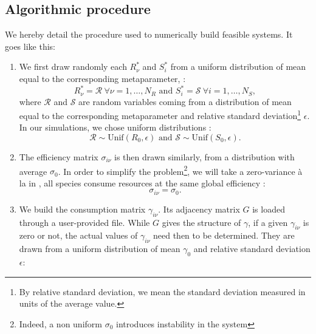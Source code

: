 \documentclass[12pt, titlepage]{report}
\begin{document}
\subsection{Algorithmic procedure}\label{sec : feasibility methods algorithmic procedure}
We hereby detail the procedure used to numerically build feasible systems. It goes like this:
\begin{enumerate}
  \item We first draw randomly each $R^*_\nu$
  and $S^*_i$ from a uniform distribution of mean equal to the corresponding metaparameter, \ie :
  \begin{equation}
     R^*_\nu = \mathcal{R} \ \forall \nu=1, \dots, N_R\text{ and }  S^*_i = \mathcal{S} \ \forall i=1, \dots, N_S,
  \end{equation}
  where $\mathcal{R}$ and $\mathcal{S}$ are random variables coming from a distribution of mean equal to the corresponding metaparameter and relative standard deviation\footnote{By relative standard deviation, we mean the standard deviation measured in units of the average value.} $\epsilon$. In our simulations, we chose uniform distributions :
  \begin{equation}
  \mathcal{R} \sim \text{Unif}(R_0, \epsilon) \text{ and } \mathcal{S} \sim \text{Unif}(S_0, \epsilon).
  \end{equation}
  \item The efficiency matrix $\sigma_{i\nu}$ is then drawn similarly, from a distribution with average $\sigma_0$. In order to simplify the problem\footnote{Indeed, a non uniform $\sigma_0$ introduces instability in the system}, we will take a zero-variance à la \citeauthor{butler_stability_2018} in \cite{butler_stability_2018}, \ie all species consume resources at the same global efficiency :
  \begin{equation}
    \sigma_{i\nu} = \sigma_0.
  \end{equation}
  \item We build the consumption matrix $\gamma_{i\nu}$. Its adjacency matrix $G$ is loaded through a user-provided file.
  While $G$ gives the structure of $\gamma$, \ie if a given $\gamma_{i\nu}$ is zero or not, the actual values of $\gamma_{i\nu}$ need then to be determined. They are drawn from a uniform distribution of mean $\gamma_0$ and relative standard deviation $\epsilon$:

\end{enumerate}
\end{document}
